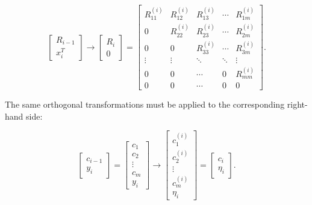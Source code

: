 \documentclass[11pt,a4paper]{article}
\begin{document}
\begin{equation}
    \begin{bmatrix}
        R_{i-1} \\
        x_i^T
    \end{bmatrix}
    \longrightarrow
    \begin{bmatrix}
        R_i \\
        0
    \end{bmatrix}
    =
    \begin{bmatrix}
        R^{(i)}_{11} & R^{(i)}_{12} & R^{(i)}_{13} & \cdots & R^{(i)}_{1m} \\
        0            & R^{(i)}_{22} & R^{(i)}_{23} & \cdots & R^{(i)}_{2m} \\
        0            & 0            & R^{(i)}_{33} & \cdots & R^{(i)}_{3m} \\
        \vdots       & \vdots       & \ddots       & \ddots & \vdots \\
        0            & 0            & \cdots       & 0      & R^{(i)}_{mm} \\
        0            & 0            & \cdots       & 0      & 0
    \end{bmatrix}.
\end{equation}

The same orthogonal transformations must be applied to the corresponding right-hand side:

\begin{equation}
    \begin{bmatrix}
        c_{i-1} \\
        y_i
    \end{bmatrix}
    =
    \begin{bmatrix}
        c_1 \\
        c_2 \\
        \vdots \\
        c_m \\
        y_i
    \end{bmatrix}
    \longrightarrow
    \begin{bmatrix}
        c^{(i)}_1 \\
        c^{(i)}_2 \\
        \vdots \\
        c^{(i)}_m \\
        \eta_i
    \end{bmatrix}
    =
    \begin{bmatrix}
        c_i \\
        \eta_i
    \end{bmatrix}.
\end{equation}
\end{document}
